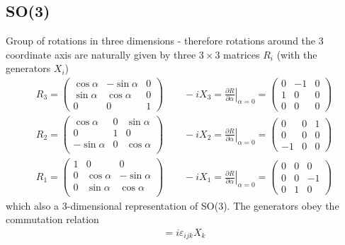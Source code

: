 \documentclass[10pt,a4paper]{book}
\theoremstyle{definition}
\begin{document}
\subsection{SO(3)}
Group of rotations in three dimensions - therefore rotations around the 3 coordinate axis are naturally given by three  $3\times3$ matrices $R_i$ (with the generators $X_i$)
\begin{align}
R_3=\left(\begin{matrix}
\cos\alpha  & -\sin\alpha & 0\\
\sin\alpha & \cos\alpha & 0\\
0 & 0 & 1 
\end{matrix}\right)
\qquad
-iX_3=\left.\frac{\partial R}{\partial\alpha}\right|_{\alpha=0}=\left(\begin{matrix}
0 & -1 & 0\\
1 & 0  & 0\\
0 & 0  & 0
\end{matrix}\right)\\
R_2=\left(\begin{matrix}
\cos\alpha  & 0 & \sin\alpha\\
0 & 1 & 0\\
-\sin\alpha & 0 & \cos\alpha\\
\end{matrix}\right)
\qquad
-iX_2=\left.\frac{\partial R}{\partial\alpha}\right|_{\alpha=0}=\left(\begin{matrix}
0 & 0  & 1\\
0 & 0  & 0\\
-1 & 0  & 0
\end{matrix}\right)\\
R_1=\left(\begin{matrix}
1 & 0 & 0 \\
0 & \cos\alpha & -\sin\alpha\\
0 & \sin\alpha &  \cos\alpha\\
\end{matrix}\right)
\qquad
-iX_1=\left.\frac{\partial R}{\partial\alpha}\right|_{\alpha=0}=\left(\begin{matrix}
0 & 0  & 0\\
0 & 0  & -1\\
0 & 1  & 0
\end{matrix}\right)
\end{align}  
which also a 3-dimensional representation of SO(3). The generators obey the commutation relation 
\begin{align}
[X_i,X_i]=i\varepsilon_{ijk}X_k
\end{align}
\end{document}
